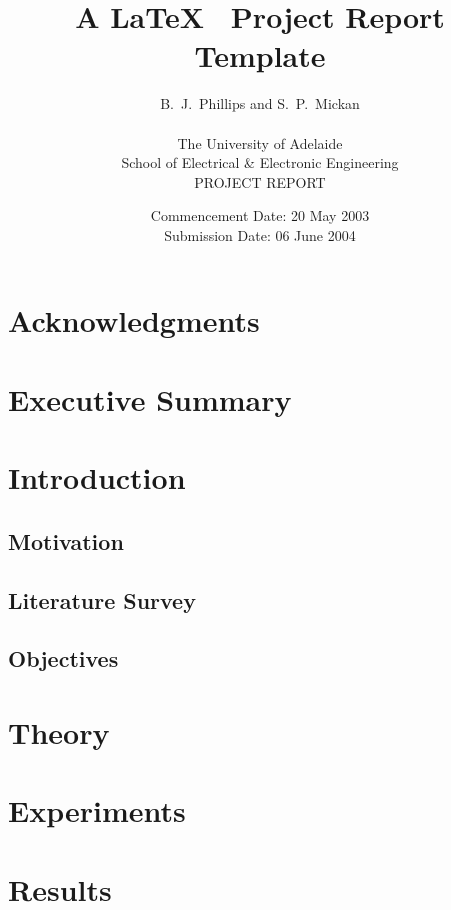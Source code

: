 \documentclass[a4paper,12pt]{article}
\title{A \LaTeX~ Project Report Template}
\author{B.~J.~Phillips and S.~P.~Mickan\\
\\
The University of Adelaide\\
School of Electrical \& Electronic Engineering\\
PROJECT REPORT}
\date{Commencement Date: 20 May 2003\\
Submission Date: 06 June 2004}
\begin{document}
\maketitle

\newpage
\section*{Acknowledgments}


\newpage
\section*{Executive Summary}


\newpage

\tableofcontents

\newpage
\section{Introduction}


\subsection{Motivation}


\subsection{Literature Survey}


\subsection{Objectives}


\section{Theory}


\section{Experiments}


\section{Results}

\end{document}
